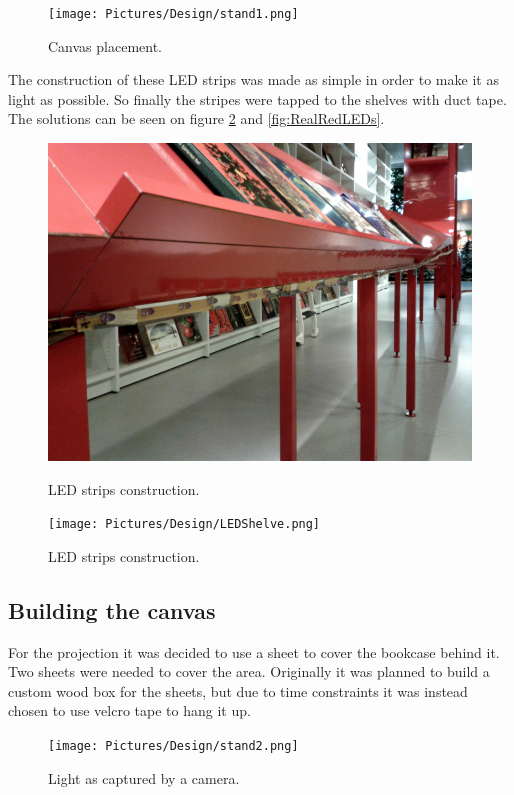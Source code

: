 \begin{figure}[htbp] 
\centering 
\texttt{[image: Pictures/Design/stand1.png]} 
\caption{Canvas placement.}
\label{fig:LEDsPosition} 
\end{figure}

The construction of these LED strips was made as simple in order to make it as light as possible. So finally the stripes were tapped to the shelves with duct tape. The solutions can be seen on figure \ref{fig:RealLEDs} and \ref{fig:RealRedLEDs}.

\begin{figure}[htbp] \centering
\begin{minipage}[b]{0.45\textwidth} \centering
\includegraphics[width=1.00\textwidth]{Pictures/Design/LEDRedShelve.png}
\caption{LED strips construction.}
\label{fig:RealRedLEDs}
\end{minipage} \hfill
\begin{minipage}[b]{0.45\textwidth} \centering
\texttt{[image: Pictures/Design/LEDShelve.png]} 
\caption{LED strips construction.}
\label{fig:RealLEDs}
\end{minipage} \hfill
\end{figure}

\subsection{Building the canvas}
For the projection it was decided to use a sheet to cover the bookcase behind it. Two sheets were needed to cover the area. Originally it was planned to build a custom wood box for the sheets, but due to time constraints it was instead chosen to use velcro tape to hang it up.
\begin{figure}[htbp] 
\centering 
\texttt{[image: Pictures/Design/stand2.png]} 
\caption{Light as captured by a camera.} 
\label{fig:CanvasPosition} 
\end{figure}